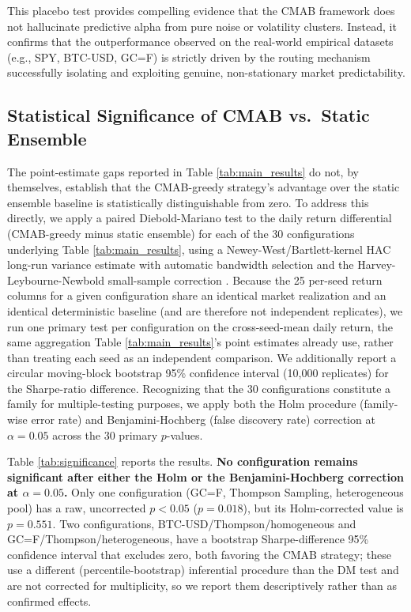 \documentclass[pdflatex,sn-mathphys-num]{sn-jnl}
\theoremstyle{thmstyleone}%
\theoremstyle{thmstyletwo}%
\theoremstyle{thmstylethree}%
\begin{document}
This placebo test provides compelling evidence that the CMAB framework does not hallucinate predictive alpha from pure noise or volatility clusters. Instead, it confirms that the outperformance observed on the real-world empirical datasets (e.g., SPY, BTC-USD, GC=F) is strictly driven by the routing mechanism successfully isolating and exploiting genuine, non-stationary market predictability.

\subsection{Statistical Significance of CMAB vs.\ Static Ensemble}
\label{sec:significance}

The point-estimate gaps reported in Table \ref{tab:main_results} do not, by themselves, establish that the CMAB-greedy strategy's advantage over the static ensemble baseline is statistically distinguishable from zero. To address this directly, we apply a paired Diebold-Mariano test \cite{diebold1995comparing} to the daily return differential (CMAB-greedy minus static ensemble) for each of the 30 configurations underlying Table \ref{tab:main_results}, using a Newey-West/Bartlett-kernel HAC long-run variance estimate \cite{newey1987simple} with automatic bandwidth selection and the Harvey-Leybourne-Newbold small-sample correction \cite{harvey1997testing}. Because the 25 per-seed return columns for a given configuration share an identical market realization and an identical deterministic baseline (and are therefore not independent replicates), we run one primary test per configuration on the cross-seed-mean daily return, the same aggregation Table \ref{tab:main_results}'s point estimates already use, rather than treating each seed as an independent comparison. We additionally report a circular moving-block bootstrap 95\% confidence interval (10,000 replicates) for the Sharpe-ratio difference. Recognizing that the 30 configurations constitute a family for multiple-testing purposes, we apply both the Holm procedure (family-wise error rate) \cite{holm1979simple} and Benjamini-Hochberg (false discovery rate) correction \cite{benjamini1995controlling} at $\alpha=0.05$ across the 30 primary $p$-values.

Table \ref{tab:significance} reports the results. \textbf{No configuration remains significant after either the Holm or the Benjamini-Hochberg correction at $\alpha=0.05$.} Only one configuration (GC=F, Thompson Sampling, heterogeneous pool) has a raw, uncorrected $p<0.05$ ($p=0.018$), but its Holm-corrected value is $p=0.551$. Two configurations, BTC-USD/Thompson/homogeneous and GC=F/Thompson/heterogeneous, have a bootstrap Sharpe-difference 95\% confidence interval that excludes zero, both favoring the CMAB strategy; these use a different (percentile-bootstrap) inferential procedure than the DM test and are not corrected for multiplicity, so we report them descriptively rather than as confirmed effects.
\end{document}

